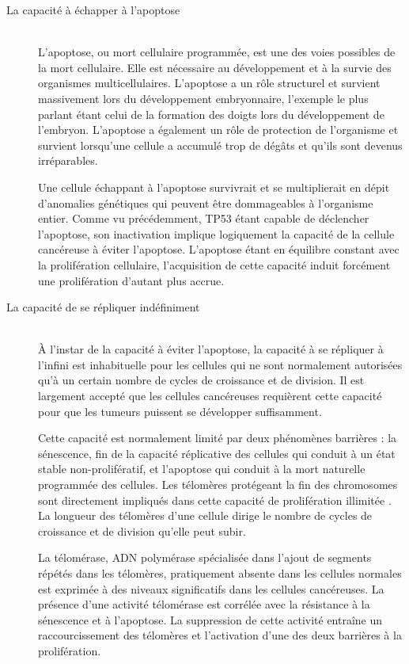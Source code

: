 \begin{description}
				\item [La capacité à échapper à l'apoptose]                         \hfill \\
					L'apoptose, ou mort cellulaire programmée, est une des voies possibles de la mort cellulaire.
					Elle est nécessaire au développement et à la survie des organismes multicellulaires.
					L'apoptose a un rôle structurel et survient massivement lors du développement embryonnaire, l'exemple le plus parlant étant celui de la formation des doigts lors du développement de l'embryon.
					L'apoptose a également un rôle de protection de l'organisme et survient lorsqu'une cellule a accumulé trop de dégâts et qu'ils sont devenus irréparables.

					Une cellule échappant à l'apoptose survivrait et se multiplierait en dépit d'anomalies génétiques qui peuvent être dommageables à l'organisme entier.
					Comme vu précédemment, \acs{TP53} étant capable de déclencher l'apoptose, son inactivation implique logiquement la capacité de la cellule cancéreuse à éviter l'apoptose.
					L'apoptose étant en équilibre constant avec la prolifération cellulaire, l'acquisition de cette capacité induit forcément une prolifération d'autant plus accrue.

				\item [La capacité de se répliquer indéfiniment]                \hfill \\
					À l'instar de la capacité à éviter l'apoptose, la capacité à se répliquer à l'infini est inhabituelle pour les cellules qui ne sont normalement autorisées qu'à un certain nombre de cycles de croissance et de division.
					Il est largement accepté que les cellules cancéreuses requièrent cette capacité pour que les tumeurs puissent se développer suffisamment.

					Cette capacité est normalement limité par deux phénomènes barrières : la sénescence, fin de la capacité réplicative des cellules qui conduit à un état stable non-prolifératif, et l'apoptose qui conduit à la mort naturelle programmée des cellules.
					Les télomères protégeant la fin des chromosomes sont directement impliqués dans cette capacité de prolifération illimitée \citep{Blasco2005}.
					La longueur des télomères d'une cellule dirige le nombre de cycles de croissance et de division qu'elle peut subir.

					La télomérase, \acs{ADN} polymérase spécialisée dans l'ajout de segments répétés dans les télomères, pratiquement absente dans les cellules normales est exprimée à des niveaux significatifs dans les cellules cancéreuses.
					La présence d'une activité télomérase est corrélée avec la résistance à la sénescence et à l'apoptose.
					La suppression de cette activité entraîne un raccourcissement des télomères et l'activation d'une des deux barrières à la prolifération.


\end{description}
